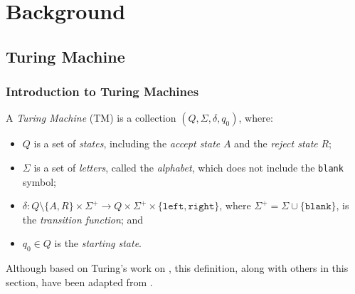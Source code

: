 \chapter{Background}
\section{Turing Machine}
\subsection{Introduction to Turing Machines}
A \emph{Turing Machine} (TM) is a collection $(Q, \Sigma, \delta, q_0)$, where:
\begin{itemize}
    \item $Q$ is a set of \emph{states}, including the \emph{accept state} $A$ and the \emph{reject state} $R$;
    \item $\Sigma$ is a set of \emph{letters}, called the \emph{alphabet}, which does not include the \texttt{blank} symbol;
    \item $\delta \colon Q \setminus \{A, R\} \times \Sigma^+ \to Q \times \Sigma^+ \times \{\texttt{left}, \texttt{right}\}$, where $\Sigma^+ = \Sigma \cup \{\texttt{blank}\}$, is the \emph{transition function}; and
    \item $q_0 \in Q$ is the \emph{starting state}.
\end{itemize}
Although based on Turing's work on \citet{turing1936computable}, this definition, along with others in this section, have been adapted from \citet{hopcroft2001automata}.

